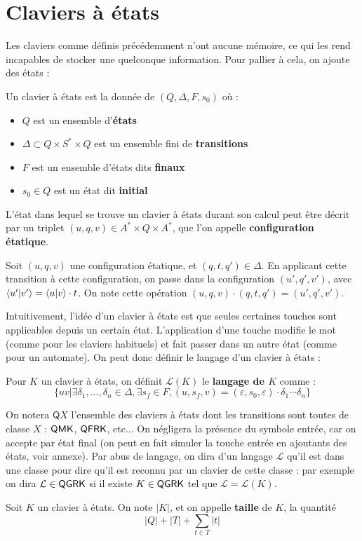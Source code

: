 \documentclass[12pt, a4paper]{article}
\renewcommand{\L}{\mathcal{L}}
\begin{document}
	\section{Claviers à états}
    Les claviers comme définis précédemment n'ont aucune mémoire, ce qui les rend incapables de stocker une quelconque information.
    Pour pallier à cela, on ajoute des états :
    \begin{defétats}
        Un clavier à états est la donnée de $(Q,\Delta ,F,s_0)$ où :
        \begin{itemize}
            \item $Q$ est un ensemble d'\textbf{états}
            \item $\Delta \subset Q \times S^* \times Q$ est un ensemble fini de \textbf{transitions}
            \item $F$ est un ensemble d'états dits \textbf{finaux}
            \item $s_0 \in Q$ est un état dit \textbf{initial}
        \end{itemize}
    \end{defétats}
    \begin{configétats}
        L'état dans lequel se trouve un clavier à états durant son calcul peut être décrit par un triplet $(u,q,v) \in A^* \times Q \times A^*$, que l'on appelle \textbf{configuration étatique}.
    \end{configétats}
    
    Soit $(u,q,v)$ une configuration étatique, et $(q,t,q') \in \Delta$. En applicant cette transition à cette configuration, on passe dans la configuration $(u',q',v')$, avec $\left\langle u' \middle| v' \right\rangle = \left\langle u \middle| v \right\rangle \cdot t$.
    On note cette opération $(u,q,v) \cdot (q,t,q') = (u',q',v')$.

    Intuitivement, l'idée d'un clavier à états est que seules certaines touches sont applicables depuis un certain état. L'application d'une touche modifie le mot (comme pour les claviers habituels)
    et fait passer dans un autre état (comme pour un automate).
    On peut donc définir le langage d'un clavier à états :

    Pour $K$ un clavier à états, on définit $\L(K)$ le \textbf{langage de $K$} comme :
    \[ \{uv | \exists\delta_1,...,\delta_n \in \Delta, \exists s_f \in F, (u,s_f,v) = (\varepsilon,s_0,\varepsilon)\cdot\delta_1\cdots\delta_n \}\]

    On notera $\mathsf{Q}X$ l'ensemble des claviers à états dont les transitions sont toutes de classe $X$ : $\mathsf{QMK}$, $\mathsf{QFRK}$, etc... 
    On négligera la présence du symbole entrée, car on accepte par état final (on peut en fait simuler la touche entrée en ajoutants des états, voir annexe).
    Par abus de langage, on dira d'un langage $\L$ qu'il est dans une classe pour dire qu'il est reconnu par un clavier de cette classe : 
    par exemple on dira $\L \in \QGRK$ si il existe $K \in \mathsf{QGRK}$ tel que $\L = \L(K)$.
    \begin{tailleclavierQ}
        Soit $K$ un clavier à états. On note $|K|$, et on appelle \textbf{taille} de $K$, la quantité 
        \[ |Q| + |T| + \sum_{t \in T} |t|\]
    \end{tailleclavierQ}
\end{document}
